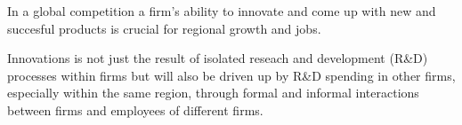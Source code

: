 \label{sec:intro}
In a global competition a firm's ability to innovate and come up with new and succesful products is crucial for regional growth and jobs.

Innovations is not just the result of isolated reseach and development (R\&D) processes within firms but will also be driven up by R\&D spending in other firms, especially within the same region, through formal and informal interactions between firms and employees of different firms.
